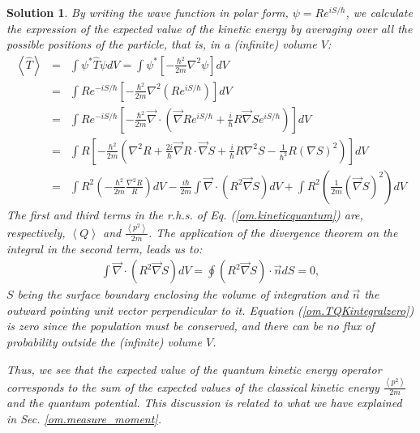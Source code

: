 \documentclass[onecolumn,nofootinbib, secnumarabic, amsmath, nobibnotes,12pt,aps,pra]{revtex4-1}
\newtheorem{solution}{Solution}
\newcommand{\sref}[1]{Sec. \ref{#1}}
\newcommand{\eref}[1]{Eq. (\ref{#1})}
\newcommand{\Eref}[1]{Equation (\ref{#1})}
\begin{document}
\begin{solution}

By writing the wave function in polar form, $\psi = R e^{iS/\hbar}$, we calculate the expression of the expected value of the kinetic energy by averaging over all the possible positions of the particle, that is, in a (infinite) volume $V$:
\begin{eqnarray}
\left\langle \hat{T} \right\rangle &=& \int \psi^* \hat{T} \psi dV = \int \psi^* \left[-\frac{\hbar^2}{2m} \nabla^2 \psi \right] dV \\
&=& \int R e^{-iS/\hbar} \left[-\frac{\hbar^2}{2m} \nabla^2 (R e^{iS/\hbar}) \right] dV \\
&=& \int R e^{-iS/\hbar} \left[-\frac{\hbar^2}{2m} \vec{\nabla} \cdot \left( \vec{\nabla} R e^{iS/\hbar} + \frac{i}{\hbar} R \vec{\nabla} S e^{iS/\hbar} \right) \right] dV \\
&=& \int R \!\left[-\frac{\hbar^2}{2m}\! \left(\! \nabla^2 R +
\frac{2i}{\hbar} \vec{\nabla} R \cdot \vec{\nabla} S + \frac{i}{\hbar} R \nabla^2 S - \frac{1}{\hbar^2} R (\nabla S)^2 \!\right)\! \right] dV \\
&=& \int R^2 \left(-\frac{\hbar^2}{2m} \frac{\nabla^2 R}{R} \right)
dV - \frac{i \hbar}{2m} \int \vec{\nabla} \cdot \left( R^2
\vec{\nabla} S\right) dV + \int R^2 \left( \frac{1}{2m} (\vec{\nabla} S)^2 \right) dV
\label{om.kineticquantum}
\end{eqnarray}
The first and third terms in the r.h.s. of \eref{om.kineticquantum} are, respectively, $\left\langle Q \right\rangle$ and $\frac{\left\langle p^2 \right\rangle}{2m}$. The application of the divergence theorem on the integral in the second term, leads us to:
\begin{eqnarray}
\int \vec{\nabla} \cdot \left( R^2 \vec{\nabla} S\right) dV = \oint \left( R^2 \vec{\nabla} S \right) \cdot \vec{n} dS = 0, \label{om.TQKintegralzero}
\end{eqnarray}
$S$ being the surface boundary enclosing the volume of integration
and $\vec{n}$ the outward pointing unit vector perpendicular to it.
\Eref{om.TQKintegralzero} is zero since the population must be
conserved, and there can be no flux of probability outside the
(infinite) volume $V$.

Thus, we see that the expected value of the quantum kinetic energy operator corresponds to the sum of the expected values of the classical kinetic energy $\frac{\left\langle p^2 \right\rangle}{2m}$ and the quantum potential. This discussion is related to what we have explained in \sref{om.measure_moment}.

\end{solution}
\end{document}
